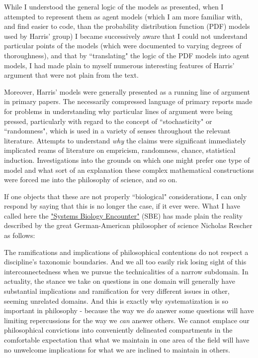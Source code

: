 While I understood the general logic of the models as presented, when I attempted to represent them as agent models (which I am more familiar with, and find easier to code, than the probability distribution function (PDF) models used by Harris' group) I became successively aware that I could not understand particular points of the models (which were documented to varying degrees of thoroughness), and that by ``translating" the logic of the PDF models into agent models, I had made plain to myself numerous interesting features of Harris' argument that were not plain from the text. 

Moreover, Harris' models were generally presented as a running line of argument in primary papers. The necessarily compressed language of primary reports made for problems in understanding why particular lines of argument were being pressed, particularly with regard to the concept of ``stochasticity" or ``randomness", which is used in a variety of senses throughout the relevant literature. Attempts to understand \textit{why} the claims were significant immediately implicated reams of literature on empricism, randomness, chance, statistical induction. Investigations into the grounds on which one might prefer one type of model and what sort of an explanation these complex mathematical constructions were forced me into the philosophy of science, and so on.

If one objects that these are not properly ``biological" considerations, I can only respond by saying that this is no longer the case, if it ever were. What I have called here the \hyperref[SBE]{"Systems Biology Encounter"} (SBE) has made plain the reality described by the great German-American philosopher of science Nicholas Rescher as follows:

\begin{longquote}
The ramifications and implications of philosophical contentions do not respect a discipline's taxonomic boundaries. And we all too easily risk losing sight of this interconnectedness when we pursue the technicalities of a narrow subdomain. In actuality, the stance we take on questions in one domain will generally have substantial implications and ramification for very different issues in other, seeming unrelated domains. And this is exactly why systematization is so important in philosophy - because the way we \textit{do} answer some questions will have limiting repercussions for the way we \textit{can} answer others. We cannot emplace our philosophical convictions into conveniently delineated compartments in the comfortable expectation that what we maintain in one area of the field will have no unwelcome implications for what we are inclined to maintain in others.
\cite[p.97]{Rescher2005}
\end{longquote}

